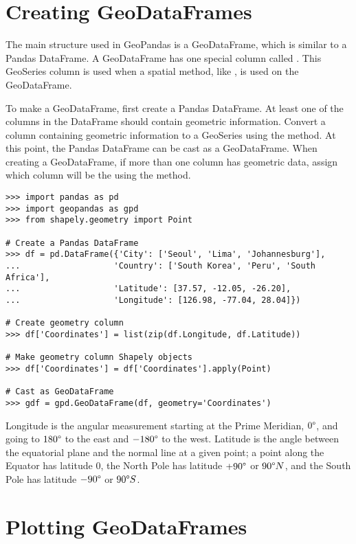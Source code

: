 \section*{Creating GeoDataFrames} %

The main structure used in GeoPandas is a GeoDataFrame, which is similar to a Pandas DataFrame.
A GeoDataFrame has one special column called .
This GeoSeries column is used when a spatial method, like , is used on the GeoDataFrame.

To make a GeoDataFrame, first create a Pandas DataFrame.
At least one of the columns in the DataFrame should contain geometric information.
Convert a column containing geometric information to a GeoSeries using the  method.
At this point, the Pandas DataFrame can be cast as a GeoDataFrame.
When creating a GeoDataFrame, if more than one column has geometric data, assign which column will be the  using the  method.

\begin{lstlisting}
>>> import pandas as pd
>>> import geopandas as gpd
>>> from shapely.geometry import Point

# Create a Pandas DataFrame
>>> df = pd.DataFrame({'City': ['Seoul', 'Lima', 'Johannesburg'],
...                   'Country': ['South Korea', 'Peru', 'South Africa'],
...                   'Latitude': [37.57, -12.05, -26.20],
...                   'Longitude': [126.98, -77.04, 28.04]})

# Create geometry column
>>> df['Coordinates'] = list(zip(df.Longitude, df.Latitude))

# Make geometry column Shapely objects
>>> df['Coordinates'] = df['Coordinates'].apply(Point)

# Cast as GeoDataFrame
>>> gdf = gpd.GeoDataFrame(df, geometry='Coordinates')
\end{lstlisting}


\begin{info}
Longitude is the angular measurement starting at the Prime Meridian, $0\degree$, and going to $180\degree$ to the east and $-180\degree$ to the west.
Latitude is the angle between the equatorial plane and the normal line at a given point; a point along the Equator has latitude $0$, the North Pole has latitude $+90\degree$ or $90\degree N$, and the South Pole has latitude $-90\degree$ or $90\degree S$.
\end{info}


\section*{Plotting GeoDataFrames} %

